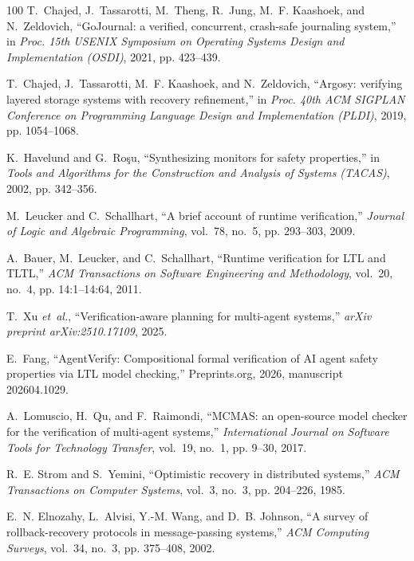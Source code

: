 \begin{thebibliography}{100}
T.~Chajed, J.~Tassarotti, M.~Theng, R.~Jung, M.~F. Kaashoek, and
  N.~Zeldovich, ``{GoJournal}: a verified, concurrent, crash-safe journaling
  system,'' in \emph{Proc. 15th USENIX Symposium on Operating Systems Design
  and Implementation (OSDI)}, 2021, pp. 423--439.

T.~Chajed, J.~Tassarotti, M.~F. Kaashoek, and N.~Zeldovich, ``{Argosy}:
  verifying layered storage systems with recovery refinement,'' in
  \emph{Proc. 40th ACM SIGPLAN Conference on Programming Language Design and
  Implementation (PLDI)}, 2019, pp. 1054--1068.

K.~Havelund and G.~Ro\c{s}u, ``Synthesizing monitors for safety properties,''
  in \emph{Tools and Algorithms for the Construction and Analysis of Systems
  (TACAS)}, 2002, pp. 342--356.

M.~Leucker and C.~Schallhart, ``A brief account of runtime verification,''
  \emph{Journal of Logic and Algebraic Programming}, vol.~78, no.~5, pp.
  293--303, 2009.

A.~Bauer, M.~Leucker, and C.~Schallhart, ``Runtime verification for {LTL} and
  {TLTL},'' \emph{ACM Transactions on Software Engineering and Methodology},
  vol.~20, no.~4, pp. 14:1--14:64, 2011.

T.~Xu \emph{et~al.}, ``Verification-aware planning for multi-agent systems,''
  \emph{arXiv preprint arXiv:2510.17109}, 2025.

E.~Fang, ``{AgentVerify}: Compositional formal verification of {AI} agent
  safety properties via {LTL} model checking,'' Preprints.org, 2026, manuscript
  202604.1029.

A.~Lomuscio, H.~Qu, and F.~Raimondi, ``{MCMAS}: an open-source model checker
  for the verification of multi-agent systems,'' \emph{International Journal
  on Software Tools for Technology Transfer}, vol.~19, no.~1, pp. 9--30, 2017.

R.~E. Strom and S.~Yemini, ``Optimistic recovery in distributed systems,''
  \emph{ACM Transactions on Computer Systems}, vol.~3, no.~3, pp. 204--226,
  1985.

E.~N. Elnozahy, L.~Alvisi, Y.-M. Wang, and D.~B. Johnson, ``A survey of
  rollback-recovery protocols in message-passing systems,'' \emph{ACM Computing
  Surveys}, vol.~34, no.~3, pp. 375--408, 2002.


\end{thebibliography}
